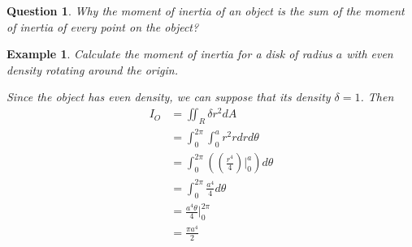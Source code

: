 \documentclass{article}
\newtheorem{example}{Example}
\newtheorem*{question}{Question}
\begin{document}
\begin{question}
  Why the moment of inertia of an object is the sum of the moment of inertia of 
  every point on the object?
\end{question}

\begin{example}
  Calculate the moment of inertia for a disk of radius $a$ with even density 
  rotating around the origin.


  Since the object has even density, we can suppose that its density 
  $\delta = 1$. Then
  \begin{equation*}
    \begin{split}
      I_O &= \iint_R \delta r^2 dA \\
          &= \int_0^{2\pi} \int_0^a r^2 r dr d\theta \\
          &= \int_0^{2\pi} ((\frac{r^4}{4})|_0^a) d\theta \\
          &= \int_0^{2\pi} \frac{a^4}{4} d\theta \\
          &= \frac{a^4\theta}{4}|_0^{2\pi} \\
          &= \frac{\pi a^4}{2} \\
    \end{split}
  \end{equation*}
\end{example}
\end{document}
